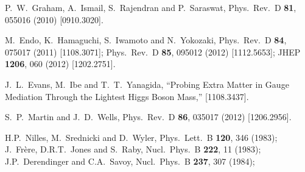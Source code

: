 \documentclass[12pt]{article}
\begin{document}
\begin{thebibliography}{999}
  P.~W.~Graham, A.~Ismail, S.~Rajendran and P.~Saraswat,
  Phys.\ Rev.\ D {\bf 81}, 055016 (2010)
  [0910.3020].

  M.~Endo, K.~Hamaguchi, S.~Iwamoto and N.~Yokozaki,
  Phys.\ Rev.\ D {\bf 84}, 075017 (2011)
  [1108.3071];
  Phys.\ Rev.\ D {\bf 85}, 095012 (2012)
  [1112.5653];
  JHEP {\bf 1206}, 060 (2012)
  [1202.2751].
  
  J.~L.~Evans, M.~Ibe and T.~T.~Yanagida,
  ``Probing Extra Matter in Gauge Mediation Through the Lightest Higgs Boson Mass,''
  [1108.3437].

  S.~P.~Martin and J.~D.~Wells,
  Phys.\ Rev.\ D {\bf 86}, 035017 (2012)
  [1206.2956].
  
H.P.~Nilles, M.~Srednicki and D.~Wyler, 
  Phys.\ Lett.\ B {\bf 120}, 346 (1983);
J.~Fr\`ere, D.R.T.~Jones and S.~Raby,
  Nucl.\ Phys.\ B {\bf 222}, 11 (1983);
J.P.~Derendinger and C.A.~Savoy,
  Nucl.\ Phys.\ B {\bf 237}, 307 (1984);
  

\end{thebibliography}
\end{document}
